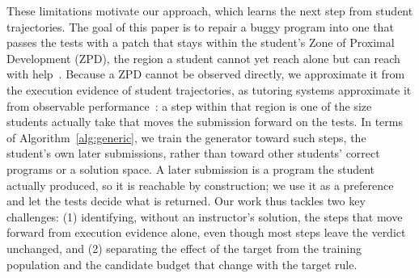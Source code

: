 \documentclass[10pt,conference]{IEEEtran}
\begin{document}
These limitations motivate our approach, which learns the next step from student trajectories. The goal of this paper is to repair a buggy program into one that passes the tests with a patch that stays within the student's Zone of Proximal Development (ZPD), the region a student cannot yet reach alone but can reach with help~\cite{vygotsky1978mind}. Because a ZPD cannot be observed directly, we approximate it from the execution evidence of student trajectories, as tutoring systems approximate it from observable performance~\cite{murray2002toward}: a step within that region is one of the size students actually take that moves the submission forward on the tests. In terms of Algorithm~\ref{alg:generic}, we train the generator toward such steps, the student's own later submissions, rather than toward other students' correct programs or a solution space. A later submission is a program the student actually produced, so it is reachable by construction; we use it as a preference and let the tests decide what is returned. Our work thus tackles two key challenges: (1) identifying, without an instructor's solution, the steps that move forward from execution evidence alone, even though most steps leave the verdict unchanged, and (2) separating the effect of the target from the training population and the candidate budget that change with the target rule.
\end{document}

